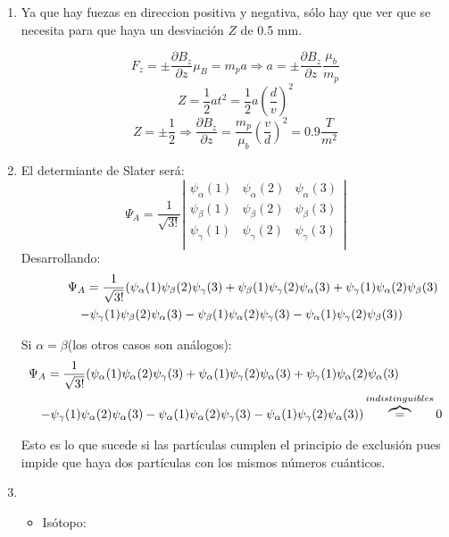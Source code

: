 \documentclass{article}
\begin{document}
\begin{enumerate}
\item Ya que hay fuezas en direccion positiva y negativa, sólo hay que ver que se necesita para que haya un desviación $Z$ de 0.5 mm.

$$F_z=\pm \frac{\partial B_z}{\partial z} \mu_B = m_p a \Rightarrow a= \pm \frac{\partial B_z}{\partial z} \frac{\mu_b}{m_p}  $$
$$Z= \frac{1}{2} a t^2= \frac{1}{2} a \left( \frac{d}{v} \right)^2 $$
$$Z= \pm \frac{1}{2} \Rightarrow \frac{\partial B_z}{\partial z} = \frac{m_p}{\mu_b} \left( \frac{v}{d} \right)^2 = 0.9 \frac{T}{m^2} $$

\item El determiante de Slater será: $$\Psi_A=\frac{1}{\sqrt{3!}} \left|
   \begin{array}{ccc}
     \psi_\alpha (1)   &  \psi_\alpha (2) &  \psi_\alpha (3)  \\
       \psi_\beta (1)   & \psi_\beta (2) & \psi_\beta (3)   \\
      \psi_\gamma (1) & \psi_\gamma(2) & \psi_\gamma (3) \\
   \end{array}
\right|
$$ 
Desarrollando: \begin{eqnarray*}
\lefteqn{ \Psi_A = \frac{1}{\sqrt{3!}} ( \psi_\alpha (1) \psi_\beta (2) \psi_\gamma (3) + \psi_\beta (1) \psi_\gamma (2) \psi_\alpha (3) + \psi_\gamma (1) \psi_\alpha (2) \psi_\beta (3) } \\ &  & - \psi_\gamma (1) \psi_\beta (2) \psi_\alpha (3) - \psi_\beta (1) \psi_\alpha (2) \psi_\gamma (3) - \psi_\alpha (1) \psi_\gamma (2) \psi_\beta (3))
\end{eqnarray*}

Si $\alpha=\beta$(los otros casos son análogos):
\begin{eqnarray*}
\lefteqn{ \Psi_A = \frac{1}{\sqrt{3!}} ( \psi_\alpha (1) \psi_\alpha (2) \psi_\gamma (3) + \psi_\alpha (1) \psi_\gamma (2) \psi_\alpha (3) + \psi_\gamma (1) \psi_\alpha (2) \psi_\alpha (3) } \\ &  & - \psi_\gamma (1) \psi_\alpha (2) \psi_\alpha (3) - \psi_\alpha (1) \psi_\alpha (2) \psi_\gamma (3) - \psi_\alpha (1) \psi_\gamma (2) \psi_\alpha (3)) \overbrace{=}^{indistinguibles} 0
\end{eqnarray*}

Esto es lo que sucede si las partículas cumplen el principio de exclusión pues impide que haya dos partículas con los mismos números cuánticos.

\item \begin{itemize}
\item Isótopo:


\end{itemize}
\end{enumerate}
\end{document}
